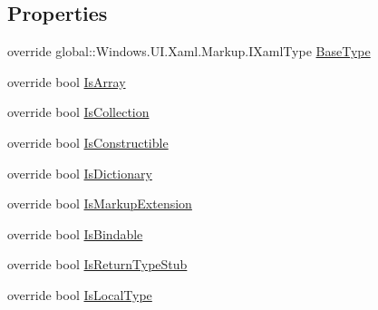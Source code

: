 \subsection*{Properties}
\begin{CompactItemize}
\item 
override global::Windows.UI.Xaml.Markup.IXamlType \hyperlink{class__2doo_1_1_u_w_p_1_1__2doo___u_w_p___xaml_type_info_1_1_xaml_user_type_6b5fe02f4981ca4745e58a6da1713c10}{BaseType}
\item 
override bool \hyperlink{class__2doo_1_1_u_w_p_1_1__2doo___u_w_p___xaml_type_info_1_1_xaml_user_type_fccc6900dfde615ddee4e077837bc393}{IsArray}
\item 
override bool \hyperlink{class__2doo_1_1_u_w_p_1_1__2doo___u_w_p___xaml_type_info_1_1_xaml_user_type_1e2abbbb4dbc428842e3749b18e17947}{IsCollection}
\item 
override bool \hyperlink{class__2doo_1_1_u_w_p_1_1__2doo___u_w_p___xaml_type_info_1_1_xaml_user_type_a6208584e4d5b76e5630d6d48617bed7}{IsConstructible}
\item 
override bool \hyperlink{class__2doo_1_1_u_w_p_1_1__2doo___u_w_p___xaml_type_info_1_1_xaml_user_type_1fcf8a3ac2fa3ae54a1c8c81b0507e9e}{IsDictionary}
\item 
override bool \hyperlink{class__2doo_1_1_u_w_p_1_1__2doo___u_w_p___xaml_type_info_1_1_xaml_user_type_049c31c49c4959d3576c66dc91cd2c50}{IsMarkupExtension}
\item 
override bool \hyperlink{class__2doo_1_1_u_w_p_1_1__2doo___u_w_p___xaml_type_info_1_1_xaml_user_type_a91506e58b98101a2b0548580438e9f2}{IsBindable}
\item 
override bool \hyperlink{class__2doo_1_1_u_w_p_1_1__2doo___u_w_p___xaml_type_info_1_1_xaml_user_type_d086281416ede7666e6dd7b402a55c44}{IsReturnTypeStub}
\item 
override bool \hyperlink{class__2doo_1_1_u_w_p_1_1__2doo___u_w_p___xaml_type_info_1_1_xaml_user_type_c28887ba144b057cbca0971a04c80174}{IsLocalType}

\end{CompactItemize}
